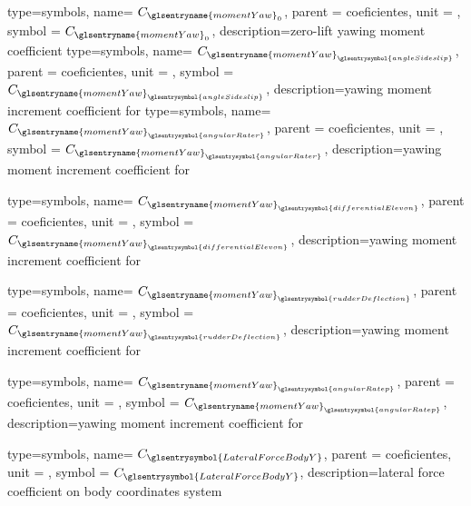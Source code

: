 {type=symbols,
    name= \ensuremath{C_{\glsentryname{momentYaw}_{0}}},
    parent = {coeficientes},
    unit = \unexpanded{},
    symbol = \ensuremath{C_{\glsentryname{momentYaw}_{0}}},
    description={zero-lift yawing moment coefficient}
}
{type=symbols,
    name= \ensuremath{C_{{\glsentryname{momentYaw}}_{\glsentrysymbol{angleSideslip}}}},
    parent = {coeficientes},
    unit = \unexpanded{},
    symbol = \ensuremath{C_{{\glsentryname{momentYaw}}_{\glsentrysymbol{angleSideslip}}}},
    description={yawing moment increment coefficient for }
}
{type=symbols,
    name= \ensuremath{C_{{\glsentryname{momentYaw}}_{\glsentrysymbol{angularRater}}}},
    parent = {coeficientes},
    unit = \unexpanded{},
    symbol = \ensuremath{C_{{\glsentryname{momentYaw}}_{\glsentrysymbol{angularRater}}}},
    description={yawing moment increment coefficient for }
}

{type=symbols,
    name= \ensuremath{C_{{\glsentryname{momentYaw}}_{\glsentrysymbol{differentialElevon}}}},
    parent = {coeficientes},
    unit = \unexpanded{},
    symbol = \ensuremath{C_{{\glsentryname{momentYaw}}_{\glsentrysymbol{differentialElevon}}}},
    description={yawing moment increment coefficient for }
}

{type=symbols,
    name= \ensuremath{C_{{\glsentryname{momentYaw}}_{\glsentrysymbol{rudderDeflection}}}},
    parent = {coeficientes},
    unit = \unexpanded{},
    symbol = \ensuremath{C_{{\glsentryname{momentYaw}}_{\glsentrysymbol{rudderDeflection}}}},
    description={yawing moment increment coefficient for }
}

{type=symbols,
    name= \ensuremath{C_{{\glsentryname{momentYaw}}_{\glsentrysymbol{angularRatep}}}},
    parent = {coeficientes},
    unit = \unexpanded{},
    symbol = \ensuremath{C_{{\glsentryname{momentYaw}}_{\glsentrysymbol{angularRatep}}}},
    description={yawing moment increment coefficient for }
}


{type=symbols,
    name= \ensuremath{C_{\glsentrysymbol{LateralForceBodyY}}},
    parent = {coeficientes},
    unit = \unexpanded{},
    symbol = \ensuremath{C_{\glsentrysymbol{LateralForceBodyY}}},
    description={lateral force coefficient on body coordinates system }
}


